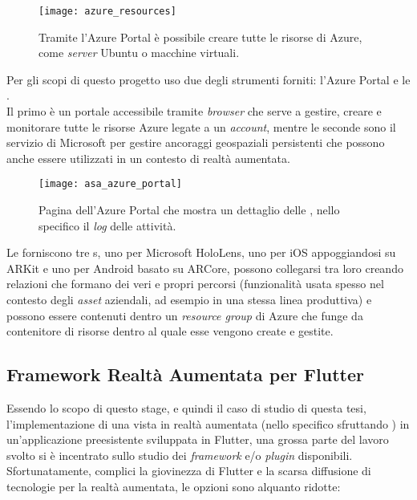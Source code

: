 \begin{figure}[H]
  \centering
  \texttt{[image: azure\_resources]}
  \caption[Azure Portal creazione risorse]{Tramite l'Azure Portal è possibile creare tutte le risorse di Azure, come \textit{server} Ubuntu o macchine virtuali.}
\end{figure}

Per gli scopi di questo progetto uso due degli strumenti forniti: l'Azure Portal e le \asa{}.\\
Il primo è un portale accessibile tramite \textit{browser} che serve a gestire, creare e monitorare tutte le risorse Azure legate a un \textit{account}, mentre le seconde sono il servizio di Microsoft per gestire ancoraggi geospaziali persistenti che possono anche essere utilizzati in un contesto di realtà aumentata.

\begin{figure}[H]
  \centering
  \texttt{[image: asa\_azure\_portal]}
  \caption[Azure Portal \asa{}]{Pagina dell'Azure Portal che mostra un dettaglio delle \asa{}, nello specifico il \textit{log} delle attività.}
\end{figure}

Le \asa{} forniscono tre \sdk{}s, uno per Microsoft HoloLens, uno per iOS appoggiandosi su ARKit e uno per Android basato su ARCore, possono collegarsi tra loro creando relazioni che formano dei veri e propri percorsi (funzionalità usata spesso nel contesto degli \textit{asset} aziendali, ad esempio in una stessa linea produttiva) e possono essere contenuti dentro un \textit{resource group} di Azure che funge da contenitore di risorse dentro al quale esse vengono create e gestite.

\subsection{Framework Realtà Aumentata per Flutter}
\label{subsec:framework_ar}
Essendo lo scopo di questo stage, e quindi il caso di studio di questa tesi, l'implementazione di una vista in realtà aumentata (nello specifico sfruttando \asa{}) in un'applicazione preesistente sviluppata in Flutter, una grossa parte del lavoro svolto si è incentrato sullo studio dei \textit{framework} e/o \textit{plugin} disponibili.\\
Sfortunatamente, complici la giovinezza di Flutter e la scarsa diffusione di tecnologie per la realtà aumentata, le opzioni sono alquanto ridotte:

